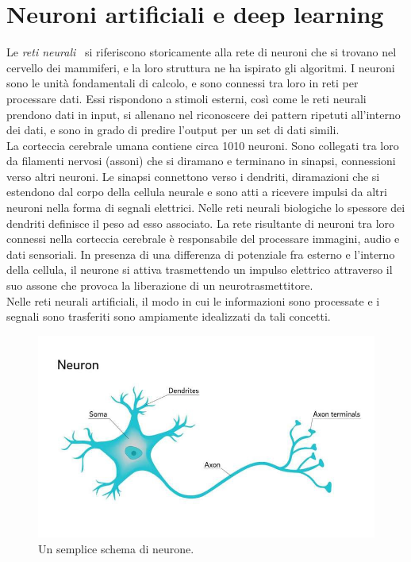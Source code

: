 \section{Neuroni artificiali e deep learning}

Le \emph{reti neurali}~\cite{reti} si riferiscono storicamente alla rete di neuroni che si trovano nel cervello dei mammiferi,
 e la loro struttura ne ha ispirato gli algoritmi. I neuroni sono le unità fondamentali di calcolo, 
 e sono connessi tra loro in reti per processare dati. Essi rispondono a stimoli esterni, così come 
 le reti neurali prendono dati in input, si allenano nel riconoscere dei pattern ripetuti all’interno 
 dei dati, e sono in grado di predire l’output per un set di dati simili.\\
  La corteccia cerebrale umana
  contiene circa 1010 neuroni. Sono collegati tra loro da filamenti nervosi (assoni) che si diramano e
   terminano in sinapsi, connessioni verso altri neuroni. Le sinapsi connettono verso i dendriti, 
   diramazioni che si estendono dal corpo della cellula neurale e sono atti a ricevere impulsi da 
   altri neuroni nella forma di segnali elettrici. Nelle reti neurali biologiche lo spessore dei 
   dendriti definisce il peso ad esso associato. La rete risultante di neuroni tra loro connessi 
   nella corteccia cerebrale è responsabile del processare immagini, audio e dati sensoriali. 
   In presenza di una differenza di potenziale fra esterno e l’interno della cellula, il neurone 
   si attiva trasmettendo un impulso elettrico attraverso il suo assone che provoca la liberazione
    di un neurotrasmettitore.\\
Nelle reti neurali artificiali, il modo in cui le informazioni sono processate e i segnali 
sono trasferiti sono ampiamente idealizzati da tali concetti. \\
\begin{figure}[hb!]
  \centering
  \includegraphics[width=1\textwidth]{Figures/neuron.jpeg}
  \caption{\small{Un semplice schema di neurone. ~\cite{neuron}
   } %
  } %
  \label{fi:dcalc}
\end{figure}

